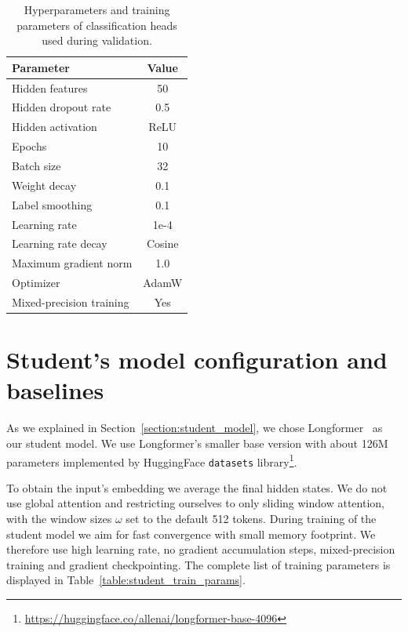 \begin{table}
  \centering
  \begin{tabular}{l c}
    \toprule
    Parameter & Value \\
    \midrule
    Hidden features & 50 \\
    Hidden dropout rate & 0.5 \\
    Hidden activation & ReLU \\
    Epochs & 10 \\
    Batch size & 32 \\
    Weight decay & 0.1 \\
    Label smoothing & 0.1 \\
    Learning rate & 1e-4 \\
    Learning rate decay & Cosine \\
    Maximum gradient norm & 1.0 \\
    Optimizer & AdamW \\
    Mixed-precision training & Yes \\
    \bottomrule
  \end{tabular}

  \caption{Hyperparameters and training parameters of classification heads used
    during validation.}

  \label{table:head_train_params}

\end{table}

\section{Student's model configuration and baselines}\label{section:student_model_config_baselines}

As we explained in Section~\ref{section:student_model}, we chose
Longformer~\citep{beltagy2020longformer} as our student model. We use
Longformer's smaller base version with about 126M parameters implemented by
HuggingFace \texttt{datasets}
library\footnote{\url{https://huggingface.co/allenai/longformer-base-4096}}.

To obtain the input's embedding we average the final hidden states. We do not
use global attention and restricting ourselves to only sliding window attention,
with the window sizes $\omega$ set to the default 512 tokens. During training of
the student model we aim for fast convergence with small memory footprint. We
therefore use high learning rate, no gradient accumulation steps,
mixed-precision training and gradient checkpointing. The complete list of
training parameters is displayed in Table~\ref{table:student_train_params}.


